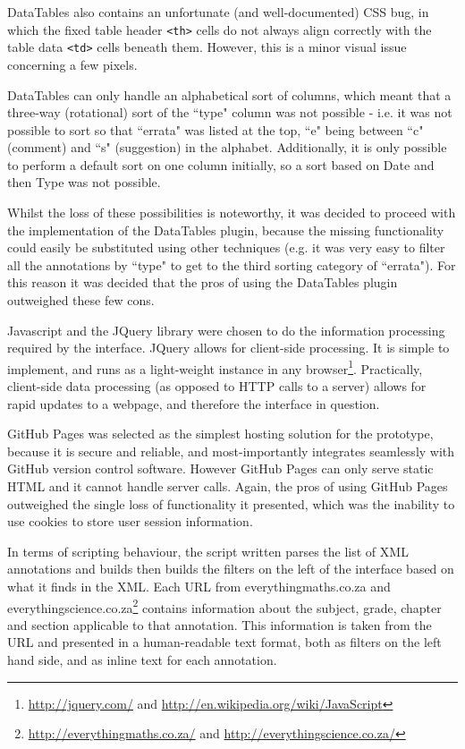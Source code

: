 DataTables also contains an unfortunate (and well-documented) CSS bug, in which the fixed table header \verb|<th>|                                                                                                                cells do not always align correctly with the table data \verb|<td>| cells beneath them. However, this is a minor visual issue concerning a few pixels.

DataTables can only handle an alphabetical sort of columns, which meant that a three-way (rotational) sort of the ``type" column was not possible - i.e. it was not possible to sort so that ``errata" was listed at the top, ``e" being between ``c" (comment) and ``s" (suggestion) in the alphabet. Additionally, it is only possible to perform a default sort on one column initially, so a sort based on Date and then Type was not possible.

Whilst the loss of these possibilities is noteworthy, it was decided to proceed with the implementation of the DataTables plugin, because the missing functionality could easily be substituted using other techniques (e.g. it was very easy to filter all the annotations by ``type" to get to the third sorting category of ``errata"). For this reason it was decided that the pros of using the DataTables plugin outweighed these few cons.

Javascript and the JQuery library were chosen to do the information processing required by the interface. JQuery allows for client-side processing. It is simple to implement, and runs as a light-weight instance in any browser\footnote{\href{http://jquery.com/}{http://jquery.com/} and \href{http://en.wikipedia.org/wiki/JavaScript}{http://en.wikipedia.org/wiki/JavaScript}}. Practically, client-side data processing (as opposed to HTTP calls to a server) allows for rapid updates to a webpage, and therefore the interface in question. 

GitHub Pages was selected as the simplest hosting solution for the prototype, because it is secure and reliable, and most-importantly integrates seamlessly with GitHub version control software. However GitHub Pages can only serve static HTML and it cannot handle server calls. Again, the pros of using GitHub Pages outweighed the single loss of functionality it presented, which was the inability to use cookies to store user session information. 


In terms of scripting behaviour, the script written parses the list of XML annotations and builds then builds the filters on the left of the interface based on what it finds in the XML. Each URL from everythingmaths.co.za and everythingscience.co.za\footnote{\href{http://everythingmaths.co.za/}{http://everythingmaths.co.za/} and \href{http://everythingscience.co.za/}{http://everythingscience.co.za/}} contains information about the subject, grade, chapter and section applicable to that annotation. This information is taken from the URL and presented in a human-readable text format, both as filters on the left hand side, and as inline text for each annotation. 

